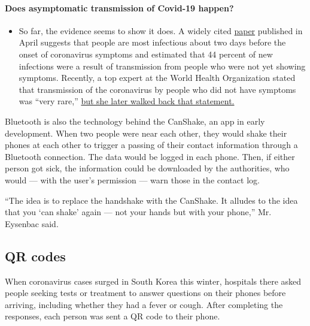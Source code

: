 \begin{itemize}
{  \paragraph{Does asymptomatic transmission of Covid-19
  happen?}\label{does-asymptomatic-transmission-of-covid-19-happen}}

  \begin{itemize}
  \tightlist
  \item
    So far, the evidence seems to show it does. A widely cited
    \href{https://www.nature.com/articles/s41591-020-0869-5}{paper}
    published in April suggests that people are most infectious about
    two days before the onset of coronavirus symptoms and estimated that
    44 percent of new infections were a result of transmission from
    people who were not yet showing symptoms. Recently, a top expert at
    the World Health Organization stated that transmission of the
    coronavirus by people who did not have symptoms was ``very rare,''
    \href{https://www.nytimes3xbfgragh.onion/2020/06/09/world/coronavirus-updates.html?action=click\&pgtype=Article\&state=default\&region=MAIN_CONTENT_3\&context=storylines_faq\#link-1f302e21}{but
    she later walked back that statement.}
  \end{itemize}
\end{itemize}

Bluetooth is also the technology behind the CanShake, an app in early
development. When two people were near each other, they would shake
their phones at each other to trigger a passing of their contact
information through a Bluetooth connection. The data would be logged in
each phone. Then, if either person got sick, the information could be
downloaded by the authorities, who would --- with the user's permission
--- warn those in the contact log.

``The idea is to replace the handshake with the CanShake. It alludes to
the idea that you `can shake' again --- not your hands but with your
phone,'' Mr. Eysenbac said.

\hypertarget{qr-codes}{%
\subsection{QR codes}\label{qr-codes}}

When coronavirus cases surged in South Korea this winter, hospitals
there asked people seeking tests or treatment to answer questions on
their phones before arriving, including whether they had a fever or
cough. After completing the responses, each person was sent a QR code to
their phone.

